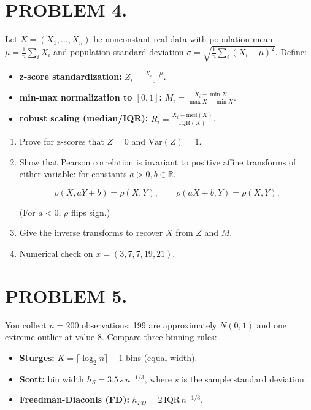 \documentclass[12pt]{article}
\begin{document}
\newpage

\section*{PROBLEM 4.}

Let \(X=(X_{1},\ldots,X_{n})\) be nonconstant real data with population mean \(\mu=\frac{1}{n}\sum_{i}X_{i}\) and population standard deviation \(\sigma=\sqrt{\frac{1}{n}\sum_{i}(X_{i}-\mu)^{2}}\). Define:

\begin{itemize}
\item \textbf{z-score standardization:} \(Z_{i}=\frac{X_{i}-\mu}{\sigma}\).
\item \textbf{min-max normalization to \([0,1]\):} \(M_{i}=\frac{X_{i}-\min X}{\max X-\min X}\).
\item \textbf{robust scaling (median/IQR):} \(R_{i}=\frac{X_{i}-\mathrm{med}(X)}{\mathrm{IQR}(X)}\).
\end{itemize}

\begin{enumerate}
\item[(a)] Prove for z-scores that \(\bar{Z}=0\) and \(\mathrm{Var}(Z)=1\).

\item[(b)] Show that Pearson correlation is invariant to positive affine transforms of either variable: for constants \(a>0,b\in\mathbb{R}\).

\[\rho(X,aY+b)=\rho(X,Y),\qquad\rho(aX+b,Y)=\rho(X,Y).\]

(For \(a<0\), \(\rho\) flips sign.)

\item[(c)] Give the inverse transforms to recover \(X\) from \(Z\) and \(M\).

\item[(d)] Numerical check on \(x=(3,7,7,19,21)\).
\end{enumerate}

\section*{PROBLEM 5.}

You collect \(n=200\) observations: 199 are approximately \(N(0,1)\) and one extreme outlier at value 8. Compare three binning rules:

\begin{itemize}
\item \textbf{Sturges:} \(K=\lceil\log_{2}n\rceil+1\) bins (equal width).
\item \textbf{Scott:} bin width \(h_{S}=3.5\,s\,n^{-1/3}\), where \(s\) is the sample standard deviation.
\item \textbf{Freedman-Diaconis (FD):} \(h_{FD}=2\,\mathrm{IQR}\,n^{-1/3}\).
\end{itemize}
\end{document}
